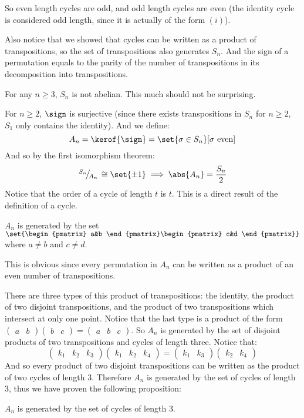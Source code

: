 \documentclass[10pt]{article}
\def\slfrac#1#2{\left.{}^{#1}\mkern-4mu\middle/\mkern-3mu{}_{#2}\right.}
\def\pmat#1{\begin{pmatrix} #1 \end{pmatrix}}
\begin{document}
So even length cycles are odd, and odd length cycles are even (the identity cycle is considered odd length, since it is actually of the form $(i)$).

Also notice that we showed that cycles can be written as a product of transpositions, so the set of transpositions also generates $S_n$.
And the sign of a permutation equals to the parity of the number of transpositions in its decomposition into transpositions.

\begin{note}

    For any $n\geq3$, $S_n$ is not abelian.
    This much should not be surprising.

\end{note}

For $n\geq2$, $\sign$ is surjective (since there exists transpositions in $S_n$ for $n\geq2$, $S_1$ only contains the identity).
And we define:
\[ A_n = \kerof{\sign} = \set{\sigma\in S_n}[\sigma \text{ even}] \]
And so by the first isomorphism theorem:
\[ \slfrac{S_n}{A_n}\cong\set{\pm1} \implies \abs{A_n} = \frac{S_n}2 \]
Notice that the order of a cycle of length $t$ is $t$.
This is a direct result of the definition of a cycle.

\begin{prop*}

    $A_n$ is generated by the set $\set{\pmat{a&b}\pmat{c&d}}$ where $a\neq b$ and $c\neq d$.

\end{prop*}

This is obvious since every permutation in $A_n$ can be written as a product of an even number of transpositions.

There are three types of this product of transpositions: the identity, the product of two disjoint transpositions, and the product of two transpositions which intersect at only one point.
Notice that the last type is a product of the form $\pmat{a&b}\pmat{b&c}=\pmat{a&b&c}$.
So $A_n$ is generated by the set of disjoint products of two transpositions and cycles of length three.
Notice that:
\[ \pmat{k_1&k_2&k_3}\pmat{k_1&k_2&k_4} = \pmat{k_1&k_3}\pmat{k_2&k_4} \]
And so every product of two disjoint transpositions can be written as the product of two cycles of length $3$.
Therefore $A_n$ is generated by the set of cycles of length $3$, thus we have proven the following proposition:

\begin{prop*}

    $A_n$ is generated by the set of cycles of length $3$.

\end{prop*}
\end{document}
